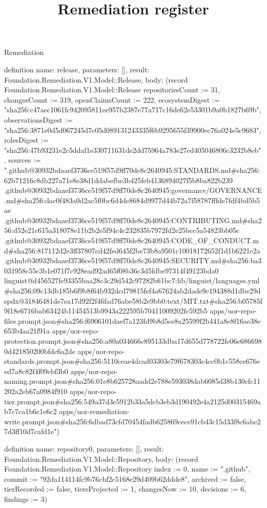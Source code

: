\begin{lexlean}{Remediation}
\title{Remediation register}
\begin{semanticmodule}
definition{
  name: release,
  parameters: [],
  result: Foundation.Remediation.V1.Model::Release,
  body: (record Foundation.Remediation.V1.Model::Release {repositoriesCount := 31, changesCount := 319, openClaimsCount := 222, ecosystemDigest := "sha256:c47aec1061fc942095811ee957b2387e77a717c16de62e53301b9a0b1827b69b", observationsDigest := "sha256:3871e0d5d067245d7c05d089131243335f6b9295655f39900ec76a024e5c9683", rolesDigest := "sha256:47b93231e2c5ddaf1e330711631de2dd75964a783e27ed405046806c3232b8eb", sources := ".github@30932bdaaef3736ce519f57d9ff70de8c2640945:STANDARDS.md#sha256:62b71216c8db227a71e8e38d1ddabefbe3b425feb4136894027f5b8ba822b239 .github@30932bdaaef3736ce519f57d9ff70de8c2640945:governance/GOVERNANCE.md#sha256:dac0f483a0d2ac5f0bc6d4de8684d9977d44b72a7f58787fffde7fdf4bd5b5ae .github@30932bdaaef3736ce519f57d9ff70de8c2640945:CONTRIBUTING.md#sha256:d52e21c615a318078e11b2b2e5f94c4c232835b7972fd2e25bcc5a54823bb05c .github@30932bdaaef3736ce519f57d9ff70de8c2640945:CODE_OF_CONDUCT.md#sha256:817112d2e3ff37807cd42fed645f2be73b8a9501c10018172652f1d1b6221e2a .github@30932bdaaef3736ce519f57d9ff70de8c2640945:SECURITY.md#sha256:ba3031958c55c3b1e071f7c928ead92ad65f08b36c3d5fdbe97314f49123bda0 linguist@d456527fe93355baa28c3c29d542c97282b61bc7:lib/linguist/languages.yml#sha256:09c13db185b6f9b8f64b932dcd79815fef4a67624ab2dade9c194388d1dbe29d spdx@31846481de7ea17d92f2f46fad76abe58b2e9bb0:text/MIT.txt#sha256:b05785f9f18e6716bab63424b11454513b9943a222595b70411009202fc592b5 apps/uor-repo-files.prompt.json#sha256:f6906101daef7a123fd9b8d5ce8a25599f2b441a8e8f16ae38e653b4aa21f91a apps/uor-repo-protection.prompt.json#sha256:a80a034666c895133dba17d655d778722fe06e6866980d421850200bfdc6a2de apps/uor-repo-standards.prompt.json#sha256:5110ceae4dcad03303e79f678303c4cc0b1c558ce676eed7a8c82f4f09ebf3b0 apps/uor-repo-naming.prompt.json#sha256:01e8b625728aadd2e788e593038dab6085d38b130cfc11202a2eb67a0984f910 apps/uor-repo-tier.prompt.json#sha256:549a37d3e5912b33a5dcb3eb3d190492e4a2125d00315469ab7c7ca1b6c1e6c2 apps/uor-remediation-write.prompt.json#sha256:6dbad73cfd70454fadb625869cece91cb43c15d33f8c6abe27d3ff10d7cafd1e"})
}

definition{
  name: repository0,
  parameters: [],
  result: Foundation.Remediation.V1.Model::Repository,
  body: (record Foundation.Remediation.V1.Model::Repository {index := 0, name := ".github", commit := "92da114114fc9b76cbf2c5168e29d409b62ddde8", archived := false, tierRecorded := false, tiersProjected := 1, changesNow := 10, decisions := 6, findings := 3})
}


\end{semanticmodule}
\end{lexlean}
